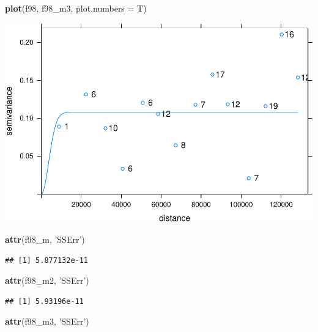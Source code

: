 \documentclass[11pt,]{article}
\newenvironment{Shaded}{\begin{snugshade}}{\end{snugshade}}
\newcommand{\KeywordTok}[1]{\textcolor[rgb]{0.13,0.29,0.53}{\textbf{#1}}}
\newcommand{\DataTypeTok}[1]{\textcolor[rgb]{0.13,0.29,0.53}{#1}}
\newcommand{\StringTok}[1]{\textcolor[rgb]{0.31,0.60,0.02}{#1}}
\newcommand{\NormalTok}[1]{#1}
\begin{document}
\begin{Shaded}
\begin{Highlighting}[]
\KeywordTok{plot}\NormalTok{(f98, f98_m3, }\DataTypeTok{plot.numbers =}\NormalTok{ T)}
\end{Highlighting}
\end{Shaded}

\includegraphics{proyecto_Superficie_Continua_files/figure-latex/unnamed-chunk-8-3.pdf}

\begin{Shaded}
\begin{Highlighting}[]
\KeywordTok{attr}\NormalTok{(f98_m, }\StringTok{'SSErr'}\NormalTok{)}
\end{Highlighting}
\end{Shaded}

\begin{verbatim}
## [1] 5.877132e-11
\end{verbatim}

\begin{Shaded}
\begin{Highlighting}[]
\KeywordTok{attr}\NormalTok{(f98_m2, }\StringTok{'SSErr'}\NormalTok{) }
\end{Highlighting}
\end{Shaded}

\begin{verbatim}
## [1] 5.93196e-11
\end{verbatim}

\begin{Shaded}
\begin{Highlighting}[]
\KeywordTok{attr}\NormalTok{(f98_m3, }\StringTok{'SSErr'}\NormalTok{)}
\end{Highlighting}
\end{Shaded}
\end{document}
